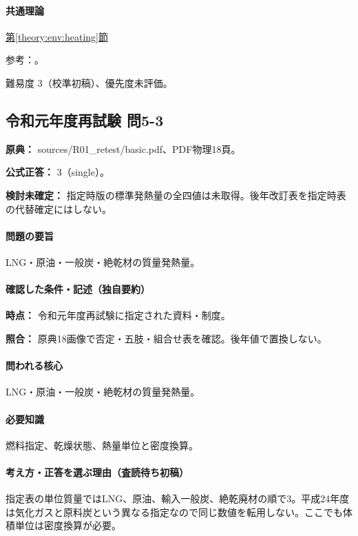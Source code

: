 \paragraph{共通理論} \hyperref[theory:env:heating]{第\ref*{theory:env:heating}節}

\par 参考：\cite{env58_heating}。

\par 難易度 3（校準初稿）、優先度未評価。

\subsection{令和元年度再試験 問5-3}
\label{q:r01-ret-basic-5-3}

\noindent\textbf{原典：} sources/R01\_retest/basic.pdf、PDF物理18頁。

\textbf{公式正答：} 3（single）。

\par\textbf{検討未確定：} 指定時版の標準発熱量の全四値は未取得。後年改訂表を指定時表の代替確定にはしない。

\paragraph{問題の要旨} LNG・原油・一般炭・絶乾材の質量発熱量。

\paragraph{確認した条件・記述（独自要約）}\mbox{}\par

\noindent\textbf{時点：} 令和元年度再試験に指定された資料・制度。\par

\noindent\textbf{照合：} 原典18画像で否定・五肢・組合せ表を確認。後年値で置換しない。\par

\paragraph{問われる核心} LNG・原油・一般炭・絶乾材の質量発熱量。

\paragraph{必要知識} 燃料指定、乾燥状態、熱量単位と密度換算。

\paragraph{考え方・正答を選ぶ理由（査読待ち初稿）} 指定表の単位質量ではLNG、原油、輸入一般炭、絶乾廃材の順で3。平成24年度は気化ガスと原料炭という異なる指定なので同じ数値を転用しない。ここでも体積単位は密度換算が必要。

